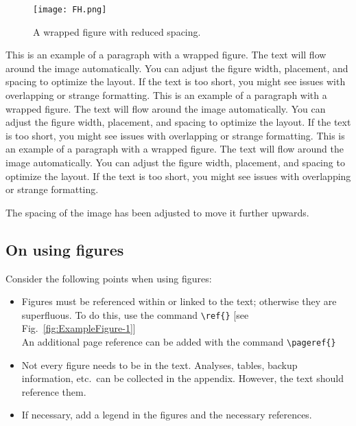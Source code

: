 \begin{wrapfigure}{r}{0.4\textwidth}  %
    \vspace{-10pt}  %
    \centering
    \texttt{[image: FH.png]}
    \caption{A wrapped figure with reduced spacing.}
    \label{fig:wrapfig}
\end{wrapfigure}



This is an example of a paragraph with a wrapped figure. The text will flow around the image automatically. You can adjust the figure width, placement, and spacing to optimize the layout. If the text is too short, you might see issues with overlapping or strange formatting.
This is an example of a paragraph with a wrapped figure. The text will flow around the image automatically. You can adjust the figure width, placement, and spacing to optimize the layout. If the text is too short, you might see issues with overlapping or strange formatting.
This is an example of a paragraph with a wrapped figure. The text will flow around the image automatically. You can adjust the figure width, placement, and spacing to optimize the layout. If the text is too short, you might see issues with overlapping or strange formatting.

The spacing of the image has been adjusted to move it further upwards.

\subsection{On using figures}
Consider the following points when using figures:
\begin{itemize}
    \item Figures must be referenced within or linked to the text; otherwise they are superfluous. To do this, use the command \verb|\ref{}|
    [see Fig.~\ref{fig:ExampleFigure-1}]\\
    An additional page reference can be added with the command \verb|\pageref{}| 
    \item Not every figure needs to be in the text. Analyses, tables, backup information, etc.~can be collected in the appendix. However, the text should reference them.
    \item If necessary, add a legend in the figures and the necessary references.
\end{itemize}